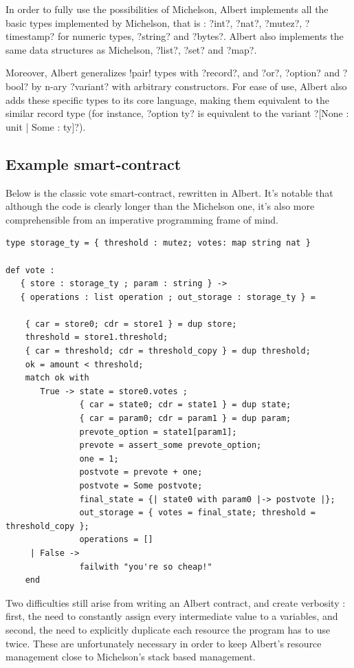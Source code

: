 \documentclass{report}
\begin{document}
In order to fully use the possibilities of Michelson, Albert implements all the basic types implemented by Michelson, that is : ?int?, ?nat?, ?mutez?, ?timestamp? for numeric types, ?string? and ?bytes?. Albert also implements the same data structures as Michelson, ?list?, ?set? and ?map?.

Moreover, Albert generalizes !pair! types with ?record?, and ?or?, ?option? and ?bool? by n-ary ?variant? with arbitrary constructors. For ease of use, Albert also adds these specific types to its core language, making them equivalent to the similar record type (for instance, ?option ty? is equivalent to the variant ?[None : unit | Some : ty]?).

\subsection{Example smart-contract}

Below is the classic vote smart-contract, rewritten in Albert. It's notable that although the code is clearly longer than the Michelson one, it's also more comprehensible from an imperative programming frame of mind.

\lstset{language=albert}
\begin{lstlisting}
type storage_ty = { threshold : mutez; votes: map string nat }

def vote :
   { store : storage_ty ; param : string } ->
   { operations : list operation ; out_storage : storage_ty } =

    { car = store0; cdr = store1 } = dup store;
    threshold = store1.threshold;
    { car = threshold; cdr = threshold_copy } = dup threshold;
    ok = amount < threshold;
    match ok with
       True -> state = store0.votes ;
               { car = state0; cdr = state1 } = dup state;
               { car = param0; cdr = param1 } = dup param;
               prevote_option = state1[param1];
               prevote = assert_some prevote_option;
               one = 1;
               postvote = prevote + one;
               postvote = Some postvote;
               final_state = {| state0 with param0 |-> postvote |};
               out_storage = { votes = final_state; threshold = threshold_copy };
               operations = []
     | False ->
               failwith "you're so cheap!"
    end
\end{lstlisting}

Two difficulties still arise from writing an Albert contract, and create verbosity : first, the need to constantly assign every intermediate value to a variables, and second, the need to explicitly duplicate each resource the program has to use twice. These are unfortunately necessary in order to keep Albert's resource management close to Michelson's stack based management.
\end{document}
